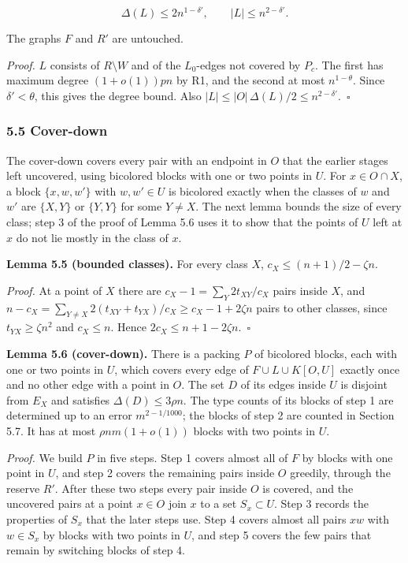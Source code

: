 \documentclass[english,11pt,a4paper]{article}
\begin{document}
\nopagebreak[4]
\[\Delta(L)\le2n^{1-\delta'},\qquad|L|\le n^{2-\delta'}.\]

The graphs \(F\) and \(R'\) are untouched.

\emph{Proof.} \(L\) consists of \(R\setminus W\) and of the \(L_0\)-edges not covered by \(P_c\). The first has maximum degree \((1+o(1))pn\) by R1, and the second at most \(n^{1-\theta}\). Since \(\delta'<\theta\), this gives the degree bound. Also \(|L|\le|O|\,\Delta(L)/2\le n^{2-\delta'}\).~\(\square\)

\subsubsection{5.5 Cover-down}\label{cover-down}

The cover-down covers every pair with an endpoint in \(O\) that the earlier stages left uncovered, using bicolored blocks with one or two points in \(U\). For \(x\in O\cap X\), a block \(\{x,w,w'\}\) with \(w,w'\in U\) is bicolored exactly when the classes of \(w\) and \(w'\) are \(\{X,Y\}\) or \(\{Y,Y\}\) for some \(Y\ne X\). The next lemma bounds the size of every class; step 3 of the proof of Lemma 5.6 uses it to show that the points of \(U\) left at \(x\) do not lie mostly in the class of \(x\).

\textbf{Lemma 5.5 (bounded classes).} For every class \(X\), \(c_X\le(n+1)/2-\zeta n\).

\emph{Proof.} At a point of \(X\) there are \(c_X-1=\sum_Y2t_{XY}/c_X\) pairs inside \(X\), and \(n-c_X=\sum_{Y\ne X}2(t_{XY}+t_{YX})/c_X\ge c_X-1+2\zeta n\) pairs to other classes, since \(t_{YX}\ge\zeta n^2\) and \(c_X\le n\). Hence \(2c_X\le n+1-2\zeta n\).~\(\square\)

\textbf{Lemma 5.6 (cover-down).} There is a packing \(P\) of bicolored blocks, each with one or two points in \(U\), which covers every edge of \(F\cup L\cup K[O,U]\) exactly once and no other edge with a point in \(O\). The set \(D\) of its edges inside \(U\) is disjoint from \(E_X\) and satisfies \(\Delta(D)\le3\rho n\). The type counts of its blocks of step 1 are determined up to an error \(m^{2-1/1000}\); the blocks of step 2 are counted in Section 5.7. It has at most \(\rho nm(1+o(1))\) blocks with two points in \(U\).

\emph{Proof.} We build \(P\) in five steps. Step 1 covers almost all of \(F\) by blocks with one point in \(U\), and step 2 covers the remaining pairs inside \(O\) greedily, through the reserve \(R'\). After these two steps every pair inside \(O\) is covered, and the uncovered pairs at a point \(x\in O\) join \(x\) to a set \(S_x\subset U\). Step 3 records the properties of \(S_x\) that the later steps use. Step 4 covers almost all pairs \(xw\) with \(w\in S_x\) by blocks with two points in \(U\), and step 5 covers the few pairs that remain by switching blocks of step 4.
\end{document}
